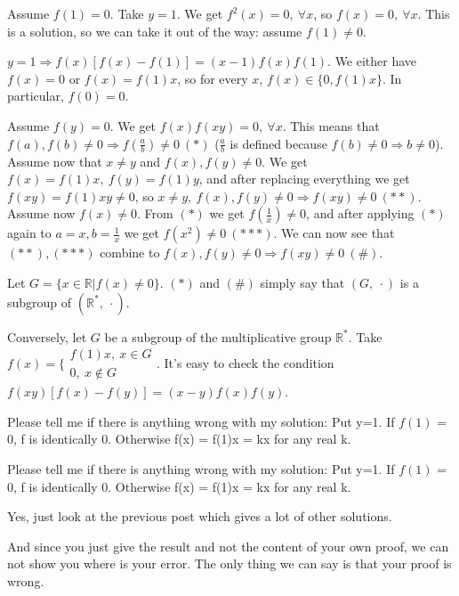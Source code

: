 \begin{solution}
	Assume $f(1)=0$. Take $y=1$. We get $f^2(x)=0,\ \forall x$, so $f(x)=0,\ \forall x$. This is a solution, so we can take it out of the way: assume $f(1)\ne 0$. 

$y=1\Rightarrow f(x)[f(x)-f(1)]=(x-1)f(x)f(1)$. We either have $f(x)=0$ or $f(x)=f(1)x$, so for every $x$, $f(x)\in\{0,f(1)x\}$. In particular, $f(0)=0$.

Assume $f(y)=0$. We get $f(x)f(xy)=0,\ \forall x$. This means that $f(a),f(b)\ne 0\Rightarrow f(\frac ab)\ne 0\ (*)$ ($\frac ab$ is defined because $f(b)\ne 0\Rightarrow b\ne 0$). Assume now that $x\ne y$ and $f(x),f(y)\ne 0$. We get $f(x)=f(1)x,\ f(y)=f(1)y$, and after replacing everything we get $f(xy)=f(1)xy\ne 0$, so $x\ne y,\ f(x),f(y)\ne 0\Rightarrow f(xy)\ne 0\ (**)$. Assume now $f(x)\ne 0$. From $(*)$ we get $f(\frac 1x)\ne 0$, and after applying $(*)$ again to $a=x,b=\frac 1x$ we get $f(x^2)\ne 0\ (***)$. We can now see that $(**),(***)$ combine to $f(x),f(y)\ne 0\Rightarrow f(xy)\ne 0\ (\#)$.

Let $G=\{x\in\mathbb R|f(x)\ne 0\}$. $(*)$ and $(\#)$ simply say that $(G,\ \cdot)$ is a subgroup of $(\mathbb R^{*},\ \cdot)$.

Conversely, let $G$ be a subgroup of the multiplicative group $\mathbb R^*$. Take $f(x)=\{\begin{array}{c}f(1)x,\ x\in G\\0,\ x\not \in G\end{array}$. It's easy to check the condition $f(xy)[f(x)-f(y)]=(x-y)f(x)f(y)$.
\end{solution}



\begin{solution}
	Please tell me if there is anything wrong with my solution:
Put y=1. If $f(1)$ = 0, f is identically 0. Otherwise f(x) = f(1)x = kx for any real k.
\end{solution}



\begin{solution}
	\begin{tcolorbox}Please tell me if there is anything wrong with my solution:
Put y=1. If $f(1)$ = 0, f is identically 0. Otherwise f(x) = f(1)x = kx for any real k.\end{tcolorbox}
Yes, just look at the previous post which gives a lot of other solutions.

And since you just give the result and not the content of your own proof, we can not show you where is your error. The only thing we can say is that your proof is wrong.
\end{solution}



